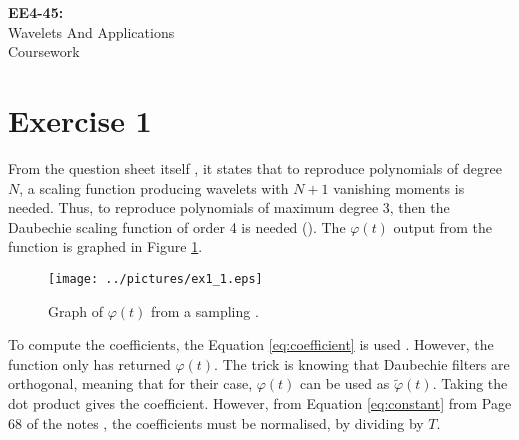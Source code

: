 \documentclass[11pt,a4paper]{report}
\newcommand{\mychapter}[2]
{
    \setcounter{chapter}{#1}
    \setcounter{section}{0}
    \chapter*{#2}
    \addcontentsline{toc}{chapter}{#2}
}
\begin{document}
\begin{titlepage}
\vspace*{\fill}

\begin{center}

\Huge{\textbf{EE4-45:}\\ Wavelets And Applications}\\
\vspace{1cm}
\Huge{Coursework}

\end{center}

\vspace*{\fill}

\end{titlepage}

\tableofcontents
\newpage

\mychapter{1}{Exercise 1}

\setcounter{page}{1}

From the question sheet itself \cite{question}, it states that to reproduce polynomials of degree $N$, a scaling function producing wavelets with $N+1$ vanishing moments is needed. Thus, to reproduce polynomials of maximum degree 3, then the Daubechie scaling function of order 4 is needed (). The $\varphi({t})$ output from the  function is graphed in Figure \ref{fig:e1_1}.

\begin{figure}[!ht]
    \centering
    \texttt{[image: ../pictures/ex1\_1.eps]}
    \caption{Graph of $\varphi({t})$ from a sampling .}
    \label{fig:e1_1}
\end{figure}

To compute the coefficients, the Equation \ref{eq:coefficient} is used \cite{question}. However, the function  only has returned $\varphi(t)$. The trick is knowing that Daubechie filters are orthogonal, meaning that for their case, $\varphi(t)$ can be used as $\tilde{\varphi}(t)$. Taking the dot product gives the coefficient. However, from Equation \ref{eq:constant} from Page 68 of the notes \cite{notes}, the coefficients must be normalised, by dividing by $T$.
\end{document}
